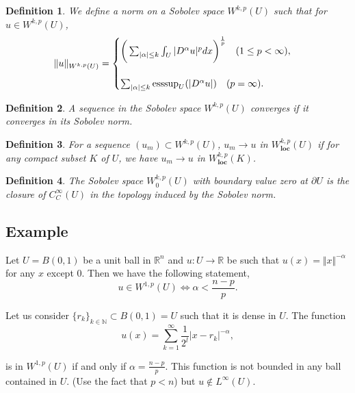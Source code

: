 \documentclass{article}
\newtheorem{definition}{Definition}[section]
\numberwithin{equation}{section}
\DeclareMathOperator{\esssup}{esssup}
\begin{document}
\begin{definition}
We define a norm on a Sobolev space $W^{k,p}(U)$ such that for $u\in W^{k,p}(U)$,
\begin{equation*}
\Vert u \Vert_{W^{k,p}(U)} = 
\begin{cases}
\bigg{(}\sum_{|\alpha|\leq k} \int_U|D^\alpha u|^pdx\bigg{)}^{{\frac 1 p}}\quad(1\leq p<\infty),\\
\\
\sum_{|\alpha|\leq k}\esssup_U(|D^\alpha u|)\quad(p=\infty).
\end{cases}
\end{equation*}
\end{definition}

\begin{definition}
A sequence in the Sobolev space $W^{k,p}(U)$ converges if it converges in its Sobolev norm.
\end{definition}

\begin{definition}
For a sequence $(u_m)\subset W^{k,p}(U)$, $u_m\to u$ in $W_{\mathbf{loc}}^{k,p}(U)$ if for any compact subset $K$ of $U$, we have $u_m\to u$ in $W_{\mathbf{loc}}^{k,p}(K)$.
\end{definition}

\begin{definition}
The Sobolev space $W^{k,p}_0(U)$ with boundary value zero at $\partial U$  is the closure of $C^{\infty}_C(U)$ in the topology induced by the Sobolev norm.
\end{definition}

\subsection{Example}

Let $U=B(0,1)$ be a unit ball in $\mathbb{R}^n$ and $u:U\to\mathbb{R}$ be such that $u(x) = \Vert x \Vert ^{-\alpha}$ for any $x$ except $0$. Then we have the following statement,
\begin{equation*}
u\in W^{1,p}(U)\Leftrightarrow \alpha<{\frac {n-p} {p}}.
\end{equation*}

Let us consider $\{r_k\}_{k\in\mathbb{N}}\subset B(0,1)=U$ such that it is dense in $U$. The function 
\begin{equation*}
u(x) = \sum_{k=1}^\infty {\frac 1 {2^l}}|x-r_k|^{-\alpha},
\end{equation*}

is in $W^{1,p}(U)$ if and only if $\alpha={\frac {n-p} {p}}$. This function is not bounded in any ball contained in $U$. (Use the fact that $p<n$) but $u\not\in L^\infty(U)$. 
\end{document}
